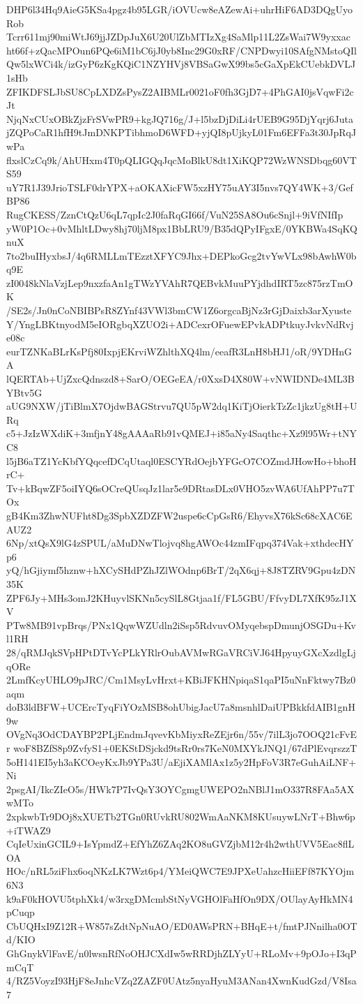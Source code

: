 DHP6l34Hq9AieG5KSa4pgz4b95LGR/iOVUcw8eAZewAi+uhrHiF6AD3DQgUyoRob
Tcrr611mj90miWtJ69jjJZDpJuX6U20UlZbMTIzXg4SaMlp11L2ZsWai7W9yxxac
ht66f+zQacMPOun6PQe6iM1bC6jJ0yb8Inc29G0xRF/CNPDwyi10SAfgNMstoQIl
Qw5lxWCi4k/izGyP6zKgKQiC1NZYHVj8VBSaGwX99bs5cGaXpEkCUebkDVLJ1sHb
ZFIKDFSLJbSU8CpLXDZsPysZ2AIBMLr0021oF0fh3GjD7+4PhGAI0jsVqwFi2cJt
NjqNxCUxOBkZjzFrSVwPR9+kgJQ716g/J+l5bzDjDiLi4rUEB9G95DjYqrj6Juta
jZQPoCaR1hfH9tJmDNKPTibhmoD6WFD+yjQI8pUjkyL01Fm6EFFa3t30JpRqJwPa
flxslCzCq9k/AhUHxm4T0pQLIGQqJqcMoBlkU8dt1XiKQP72WzWNSDbqg60VTS59
uY7R1J39JrioTSLF0drYPX+aOKAXicFW5xzHY75uAY3I5nvs7QY4WK+3/GefBP86
RugCKESS/ZznCtQzU6qL7qpIc2J0faRqGI66f/VuN25SA8Ou6cSnjl+9iVfNIfIp
yW0P1Oc+0vMhltLDwy8hj70ljM8px1BbLRU9/B35dQPyIFgxE/0YKBWa4SqKQnuX
7to2buIHyxbsJ/4q6RMLLmTEzztXFYC9Jhx+DEPkoGcg2tvYwVLx98bAwhW0bq9E
zI0048kNlaVzjLep9nxzfaAn1gTWzYVAhR7QEBvkMuuPYjdhdIRT5zc875rzTmOK
/SE2s/Jn0nCoNBIBPsR8ZYnf43VWl3bmCW1Z6orgcaBjNz3rGjDaixb3arXyuste
Y/YngLBKtnyodM5eIORgbqXZUO2i+ADCexrOFuewEPvkADPtkuyJvkvNdRvje08c
eurTZNKaBLrKsPfj80IxpjEKrviWZhlthXQ4lm/eeafR3LnH8bHJ1/oR/9YDHnGA
lQERTAb+UjZxcQdnszd8+SarO/OEGeEA/r0XxsD4X80W+vNWIDNDe4ML3BYBtv5G
aUG9NXW/jTiBlmX7OjdwBAGStrvu7QU5pW2dq1KiTjOierkTzZc1jkzUg8tH+URq
c5+JzIzWXdiK+3mfjnY48gAAAaRb91vQMEJ+i85aNy4Saqthc+Xz9l95Wr+tNYC8
l5jB6aTZ1YcKbfYQqcefDCqUtaql0ESCYRdOejbYFGcO7COZmdJHowHo+bhoHrC+
Tv+kBqwZF5oiIYQ6sOCreQUsqJz1lar5e9DRtasDLx0VHO5zvWA6UfAhPP7u7TOx
gB4Km3ZhwNUFht8Dg3SpbXZDZFW2uspe6cCpGsR6/EhyvsX76kSc68cXAC6EAUZ2
6Np/xtQsX9lG4zSPUL/aMuDNwTlojvq8hgAWOc44zmIFqpq374Vak+xthdecHYp6
yQ/hGjiymf5hznw+hXCySHdPZhJZlWOdnp6BrT/2qX6qj+8J8TZRV9Gpu4zDN35K
ZPF6Jy+MHs3omJ2KHuyvlSKNn5cySlL8Gtjaa1f/FL5GBU/FfvyDL7XfK95zJ1XV
PTw8MB91vpBrqs/PNx1QqwWZUdln2iSsp5RdvuvOMyqebspDmunjOSGDu+Kvl1RH
28/qRMJqkSVpHPtDTvYcPLkYRlrOubAVMwRGaVRCiVJ64HpyuyGXcXzdlgLjqORe
2LmfKcyUHLO9pJRC/Cm1MsyLvHrxt+KBiJFKHNpiqaS1qaPI5uNnFktwy7Bz0aqm
doB3ldBFW+UCErcTyqFiYOzMSB8ohUbigJacU7a8msnhlDaiUPBkkfdAIB1gnH9w
OVgNq3OdCDAYBP2PLjEndmJqvevKbMiyxReZEjr6n/55v/7ilL3jo7OOQ21cFvEr
woF8BZfS8p9ZvfyS1+0EKStDSjckd9tsRr0rs7KeN0MXYkJNQ1/67dPlEvqrszzT
5oH141EI5yh3aKCOeyKxJb9YPa3U/aEjiXAMlAx1z5y2HpFoV3R7eGuhAiLNF+Ni
2psgAI/IkcZIeO5s/HWk7P7IvQsY3OYCgmgUWEPO2nNBlJ1mO337R8FAa5AXwMTo
2xpkwbTr9DOj8xXUETb2TGn0RUvkRU802WmAaNKM8KUsuywLNrT+Bhw6p+iTWAZ9
CqIeUxinGCIL9+IsYpmdZ+EfYhZ6ZAq2KO8uGVZjbM12r4h2wthUVV5Eac8flLOA
HOc/nRL5ziFhx6oqNKzLK7Wzt6p4/YMeiQWC7E9JPXeUahzcHiiEFf87KYOjm6N3
k9aF0kHOVU5tphXk4/w3rxgDMcmbStNyVGHOlFaHfOn9DX/OUlayAyHkMN4pCuqp
CbUQHxI9Z12R+W857sZdtNpNuAO/ED0AWsPRN+BHqE+t/fmtPJNnilha0OTd/KIO
GhGnykVlFavE/n0lwsnRfNoOHJCXdIw5wRRDjhZLYyU+RLoMv+9pOJo+I3qPmCqT
4/RZ5VoyzI93HjF8eJnhcVZq2ZAZF0UAtz5nyaHyuM3ANan4XwnKudGzd/V8Isa7
